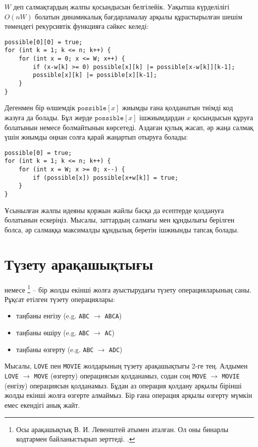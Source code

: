 $W$ деп салмақтардың жалпы қосындысын белгілейік. 
Уақытша күрделілігі $O(nW)$ болатын
динамикалық бағдарламалау арқылы құрастырылған шешім төмендегі
рекурсивтік функцияға сәйкес келеді:
\begin{lstlisting}
possible[0][0] = true;
for (int k = 1; k <= n; k++) {
    for (int x = 0; x <= W; x++) {
        if (x-w[k] >= 0) possible[x][k] |= possible[x-w[k]][k-1];
        possible[x][k] |= possible[x][k-1];
    }
}
\end{lstlisting}

Дегенмен бір өлшемдік $\texttt{possible}[x]$ жиымды ғана қолданатын 
тиімді код жазуға да болады. Бұл жерде $\texttt{possible}[x]$
ішжиымдардан $x$ қосындысын құруға болатынын немесе болмайтынын көрсетеді.
Аздаған қулық жасап, әр жаңа салмақ үшін жиымды оңнан солға қарай жаңартып отыруға болады:
\begin{lstlisting}
possible[0] = true;
for (int k = 1; k <= n; k++) {
    for (int x = W; x >= 0; x--) {
        if (possible[x]) possible[x+w[k]] = true;
    }
}
\end{lstlisting}

Ұсынылған жалпы идеяны қоржын жайлы басқа да есептерде
қолдануға болатынын ескеріңіз. Мысалы, заттардың
салмағы мен құндылығы берілген болса, әр салмаққа 
максималды құндылық беретін ішжиынды тапсақ болады.

\section{Түзету арақашықтығы}


 немесе \footnote{Осы арақашықтық В. И. Левенштей атымен аталған. Ол оны бинарлы кодтармен байланыстырып зерттеді. \cite{lev66}.} 
-- бір жолды екінші жолға ауыстырудағы түзету операцияларының саны.
Рұқсат етілген түзету операциялары:
\begin{itemize}
\item таңбаны енгізу (e.g. \texttt{ABC} $\rightarrow$ \texttt{ABCA})
\item таңбаны өшіру (e.g. \texttt{ABC} $\rightarrow$ \texttt{AC})
\item таңбаны өзгерту (e.g. \texttt{ABC} $\rightarrow$ \texttt{ADC})
\end{itemize}

Мысалы, \texttt{LOVE} пен \texttt{MOVIE} жолдарының
түзету арақашықтығы 2-ге тең.  Алдымен 
\texttt{LOVE} $\rightarrow$ \texttt{MOVE} (өзгерту) 
операциясын қолданамыз, содан соң 
\texttt{MOVE} $\rightarrow$ \texttt{MOVIE} (енгізу)
операциясын қолданамыз. 
Бұдан аз операция қолдану арқылы 
бірінші жолды екінші жолға өзгерте
алмаймыз. Бір ғана операция арқылы
өзгерту мүмкін емес екендігі анық жайт.

